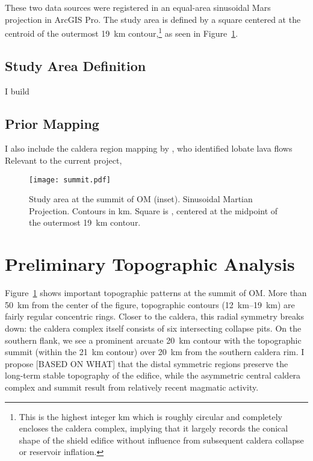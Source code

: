 These two data sources were registered in an equal-area sinusoidal Mars projection in ArcGIS Pro. The study area is defined by a square  centered at the centroid of the outermost \qty{19}{\km} contour,\footnote{This is the highest integer \unit{km} which is roughly circular and completely encloses the caldera complex, implying that it largely records the conical shape of the shield edifice without influence from subsequent caldera collapse or reservoir inflation.} as seen in Figure~\ref{fig:summit}.

\subsection{Study Area Definition}
I build 

\subsection{Prior Mapping}
I also include the caldera region mapping by \textcite{mouginis-mark_geologic_2021}, who identified lobate lava flows Relevant to the current project, 

\begin{figure}
    \centering
    \texttt{[image: summit.pdf]}
    \caption[Study area: \acl{OM} summit]{Study area at the summit of \acl{OM} (inset). Sinusoidal Martian Projection. Contours in \unit{km}. Square is , centered at the midpoint of the outermost \qty{19}{\km} contour.}
    \label{fig:summit}
\end{figure}

\section{Preliminary Topographic Analysis}

Figure~\ref{fig:summit} shows important topographic patterns at the summit of \ac{OM}. More than \qty{50}{\km} from the center of the figure, topographic contours (\qtyrange{12}{19}{\km}) are fairly regular concentric rings. Closer to the caldera, this radial symmetry breaks down: the caldera complex itself consists of six intersecting collapse pits. On the southern flank, we see a prominent arcuate \qty{20}{\km} contour with the topographic summit (within the \qty{21}{\km} contour) over \qty{20}{\km} from the southern caldera rim. I propose [BASED ON WHAT] that the distal symmetric regions preserve the long-term stable topography of the edifice, while the asymmetric central caldera complex and summit result from relatively recent magmatic activity. 

